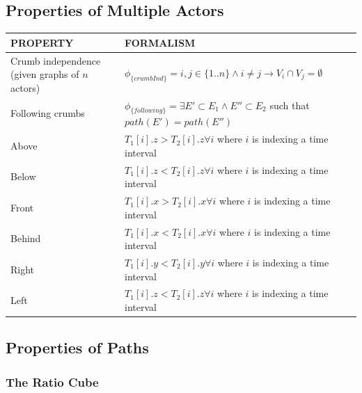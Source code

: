 \subsection{Properties of Multiple Actors}
\begin{tabular}{| p{2.8cm} | p{11.5cm} | }
\hline
PROPERTY & FORMALISM \\ \hline
 Crumb independence (given graphs of $n$ actors)& $\phi_{\{crumbInd\}} =  i,j \in \{1..n\} \land i \neq j \rightarrow V_i \cap V_j = \emptyset $ \\ \hline
 Following crumbs & $\phi_{\{following\}} =  \exists E' \subset E_1 \land E'' \subset E_2$ such that $path(E')=path(E'') $  \\ \hline
 Above & $T_1[i].z > T_2[i].z \forall i$ where $i$ is indexing a time interval\\ \hline
 Below & $T_1[i].z < T_2[i].z \forall i$ where $i$ is indexing a time interval\\ \hline
 Front & $T_1[i].x > T_2[i].x \forall i$ where $i$ is indexing a time interval\\ \hline
 Behind & $T_1[i].x < T_2[i].x \forall i$ where $i$ is indexing a time interval\\ \hline
 Right & $T_1[i].y < T_2[i].y \forall i$ where $i$ is indexing a time interval \\ \hline
 Left & $T_1[i].z < T_2[i].z \forall i$ where $i$ is indexing a time interval \\ \hline
\end{tabular}


\subsection{Properties of Paths}
\subsubsection{The Ratio Cube}

